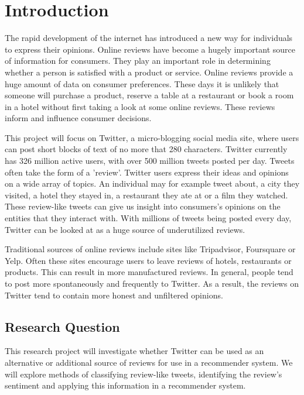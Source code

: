 \chapter{Introduction}
\begin{justify}
The rapid development of the internet has introduced a new way for individuals to express their opinions. Online reviews have become a hugely important source of information for consumers. They play an important role in determining whether a person is satisfied with a product or service. Online reviews provide a huge amount of data on consumer preferences. These days it is unlikely that someone will purchase a product, reserve a table at a restaurant or book a room in a hotel without first taking a look at some online reviews. These reviews inform and influence consumer decisions.
\end{justify}

This project will focus on Twitter, a micro-blogging social media site, where users can post short blocks of text of no more that 280 characters. Twitter currently has 326 million active users, with over 500 million tweets posted per day. Tweets often take the form of a 'review'. Twitter users express their ideas and opinions on a wide array of topics. An individual may for example tweet about, a city they visited, a hotel they stayed in, a restaurant they ate at or a film they watched. These review-like tweets can give us insight into consumers’s opinions on the entities that they interact with. With millions of tweets being posted every day, Twitter can be looked at as a huge source of underutilized reviews.

Traditional sources of online reviews include sites like Tripadvisor, Foursquare or Yelp. Often these sites encourage users to leave reviews of hotels, restaurants or products. This can result in more manufactured reviews. In general, people tend to post more spontaneously and frequently to Twitter. As a result, the reviews on Twitter tend to contain more honest and unfiltered opinions. 

\section{Research Question}
This research project will investigate whether Twitter can be used as an alternative or additional source of reviews for use in a recommender system. We will explore methods of classifying review-like tweets, identifying the review's sentiment and applying this information in a recommender system.

